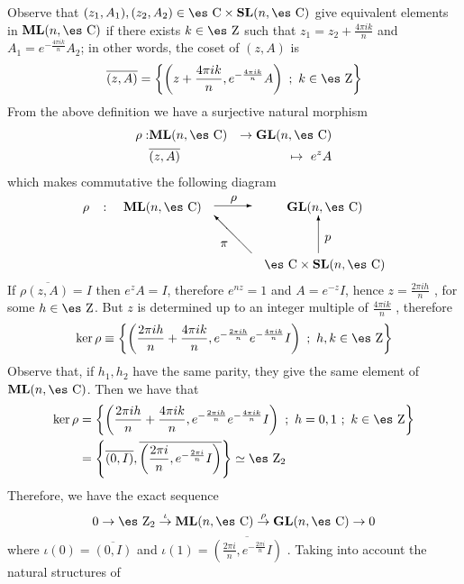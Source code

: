 \documentclass[12pt]{article}
\theoremstyle{plain}
\def\beq{\begin{equation}}
\def\eeq{\end{equation}}
\def\beann{\begin{eqnarray*}}
\def\eeann{\end{eqnarray*}}
\def\dst{\(}
\def\map#1{\mathrel{\mathop{\to}\limits^{#1}}}
\def\GL{{\bf GL}(n,\Complex )}
\def\SL{{\bf SL}(n,\Complex )}
\def\ML{{\bf ML}(n,\Complex )}
\def\Zahl{\mbox{\es Z}}
\def\Complex{\mbox{\es C}}
\begin{document}
Observe that $(z_1,A_1),(z_2,A_2)\in\Complex\times\SL$
 give equivalent elements in $\ML$ if there exists $k \in \Zahl$ such
that
\dst z_1 = z_2 + \frac{4\pi i k}{n}\) and $A_1=e^{-\frac{4\pi i
k}{n}}A_2$;
in other words, the coset of $(z,A)$ is
 $$
 \overline{(z,A)} =\left\{ \left( z + \frac{4\pi i k}{n} ,
 e^{-\frac{4\pi i k}{n}}A\right) \ ;
 \ k \in \Zahl\right\}
 $$
  From the above definition we have a surjective natural morphism
\beann
\rho : &\ML& \to \GL
\\
&\overline{(z,A)}& \mapsto \ e^{z}A
\eeann
which makes commutative the following diagram
$$
\begin{array}{ccccc}
\rho & \colon & \ML &
\begin{picture}(30,10)(0,0)
\put(13,8){\mbox{$\rho$}}
\put(0,4){\vector(1,0){30}}
\end{picture}
&\GL
\\
& & &
\begin{picture}(30,30)(0,0)
\put(5,5){\mbox{$\pi$}}
\put(30,0){\vector(-1,1){30}}
\end{picture}
&
\begin{picture}(10,30)(0,0)
\put(5,10){\mbox{$p$}}
\put(0,0){\vector(0,1){30}}
\end{picture}
\\
& & & &\Complex \times \SL
\end{array}
$$ 
If $\rho\overline{(z,A)} = I$ then $e^{z}A = I$, therefore
$e^{nz} = 1$ and $A = e^{-z}I$, hence \dst z = \frac{2\pi i
h}{n}\) , for some $h \in \Zahl$. But $z$ is determined up to an
integer multiple of \dst \frac{4\pi i k}{n}\) , therefore $$ \ker
\rho \equiv\left\{ \left(\frac{2\pi i h}{n} + \frac{4\pi i k}{n},
e^{-\frac{2\pi i h}{n}} e^{-\frac{4\pi i k}{n}}I \right) \ ; \ h,k
\in \Zahl \right\} $$ 
Observe that, if $h_1,h_2$ have the same
parity, they give the same element of $\ML$. Then we have that 
\begin{align*}
\ker \rho&= \left\{ \left(\frac{2\pi i h}{n} + \frac{4\pi i k}{n},
e^{-\frac{2\pi i h}{n}} e^{-\frac{4\pi i k}{n}}I \right) \ ; \
h=0,1 \ ; \ k \in \Zahl \right\}\\
& = \left\{ \overline{(0,I)},
\overline{\left(\frac{2\pi i}{n},e^{-\frac{2\pi i}{n}}I\right)}
\right\} \simeq \Zahl_2
\end{align*}
Therefore, we have the exact sequence
\beq 0 \map{} \Zahl_2 \map{\iota} \ML \map{\rho} \GL \map{} 0
\label{es3} \eeq where \dst \iota (0) = \overline{(0,I)}\) and
\dst\iota (1)=\overline{\left(\frac{2\pi i}{n},e^{-\frac{2\pi
i}{n}}I\right)}\) . Taking into account the natural structures of
\end{document}
